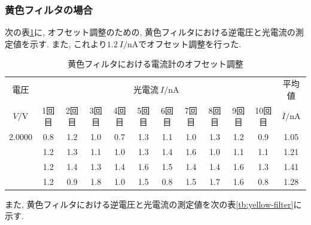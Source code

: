 \documentclass{jarticle}
\begin{document}
\subsubsection{黄色フィルタの場合}

次の表\ref{tb:yellow-filter-offset}に, オフセット調整のための, 黄色フィルタにおける逆電圧と光電流の測定値を示す.
また, これより$1.2\ I/\mathrm{nA}$でオフセット調整を行った.

\begin{table}[H]
  \caption{黄色フィルタにおける電流計のオフセット調整}
  \label{tb:yellow-filter-offset}
  \hspace{-2.5cm}
  \begin{tabular}{cccccccccccc}
    \hline
    電圧 & \multicolumn{10}{c}{光電流$\ I/\mathrm{nA}$} & 平均値 \\
    $V/\mathrm{V}$ & 1回目 & 2回目 & 3回目 & 4回目 & 5回目 & 6回目 & 7回目 & 8回目 & 9回目 & 10回目 & $\overline{I}/\mathrm{nA}$ \\
    \hline
    2.0000 & 0.8 & 1.2 & 1.0 & 0.7 & 1.3 & 1.1 & 1.0 & 1.3 & 1.2 & 0.9 & 1.05 \\
    & 1.2 & 1.3 & 1.1 & 1.0 & 1.3 & 1.4 & 1.6 & 1.0 & 1.1 & 1.1 & 1.21 \\
    & 1.2 & 1.4 & 1.3 & 1.4 & 1.6 & 1.5 & 1.4 & 1.4 & 1.6 & 1.3 & 1.41 \\
    & 1.2 & 0.9 & 1.8 & 1.0 & 1.5 & 0.8 & 1.5 & 1.7 & 1.6 & 0.8 & 1.28 \\
    \hline
  \end{tabular}
\end{table}

また, 黄色フィルタにおける逆電圧と光電流の測定値を次の表\ref{tb:yellow-filter}に示す.
\end{document}
